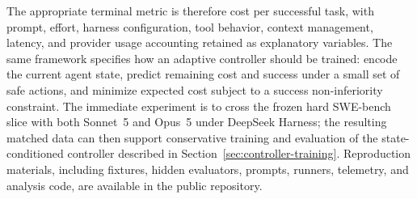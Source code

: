 \documentclass[11pt]{article}
\begin{document}
The appropriate terminal metric is therefore cost per successful task, with
prompt, effort, harness configuration, tool behavior, context management,
latency, and provider usage accounting retained as explanatory variables. The
same framework specifies how an adaptive controller should be trained: encode
the current agent state, predict remaining cost and success under a small set of
safe actions, and minimize expected cost subject to a success non-inferiority
constraint. The immediate experiment is to cross the frozen hard SWE-bench
slice with both Sonnet~5 and Opus~5 under DeepSeek Harness; the resulting
matched data can then support conservative training and evaluation of the
state-conditioned controller described in Section~\ref{sec:controller-training}.
Reproduction materials, including fixtures, hidden evaluators, prompts,
runners, telemetry, and analysis code, are available in the public repository.
\end{document}
